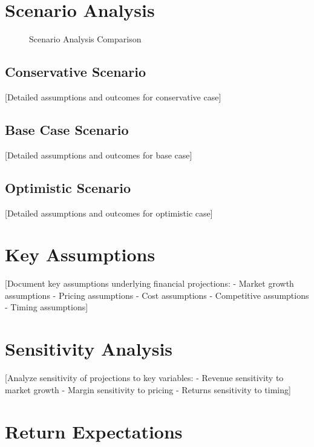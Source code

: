 \documentclass[11pt,letterpaper]{report}
\begin{document}
\section{Scenario Analysis}


\begin{figure}[htbp]
\centering
\caption{Scenario Analysis Comparison}
\label{fig:scenarios}
\end{figure}

\subsection{Conservative Scenario}
[Detailed assumptions and outcomes for conservative case]

\subsection{Base Case Scenario}
[Detailed assumptions and outcomes for base case]

\subsection{Optimistic Scenario}
[Detailed assumptions and outcomes for optimistic case]

\section{Key Assumptions}

[Document key assumptions underlying financial projections:
- Market growth assumptions
- Pricing assumptions
- Cost assumptions
- Competitive assumptions
- Timing assumptions]

\section{Sensitivity Analysis}

[Analyze sensitivity of projections to key variables:
- Revenue sensitivity to market growth
- Margin sensitivity to pricing
- Returns sensitivity to timing]

\section{Return Expectations}
\end{document}
